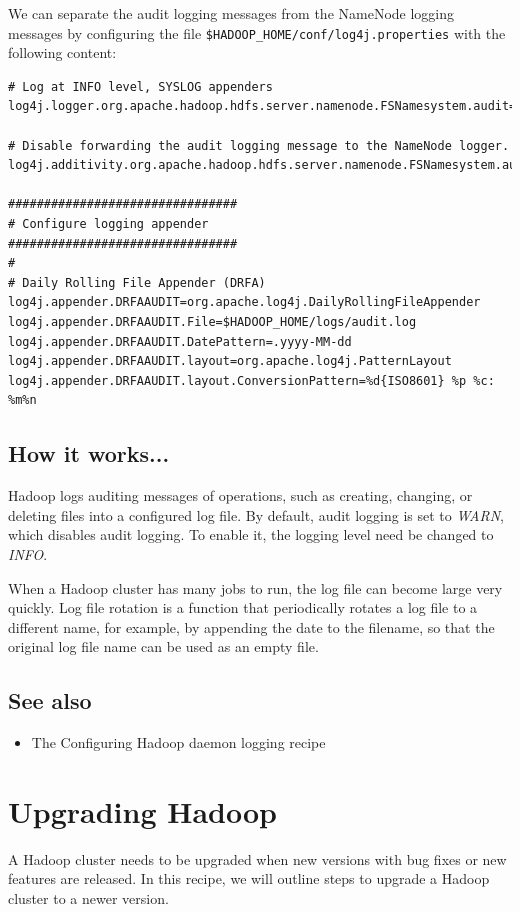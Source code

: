 We can separate the audit logging messages from the NameNode logging messages by configuring the file \verb|$HADOOP_HOME/conf/log4j.properties| with the following content: 
\lstset{style=bashstyle}
\begin{lstlisting}
# Log at INFO level, SYSLOG appenders
log4j.logger.org.apache.hadoop.hdfs.server.namenode.FSNamesystem.audit=INFO

# Disable forwarding the audit logging message to the NameNode logger.
log4j.additivity.org.apache.hadoop.hdfs.server.namenode.FSNamesystem.audit=false

################################
# Configure logging appender
################################
#
# Daily Rolling File Appender (DRFA)
log4j.appender.DRFAAUDIT=org.apache.log4j.DailyRollingFileAppender
log4j.appender.DRFAAUDIT.File=$HADOOP_HOME/logs/audit.log
log4j.appender.DRFAAUDIT.DatePattern=.yyyy-MM-dd
log4j.appender.DRFAAUDIT.layout=org.apache.log4j.PatternLayout
log4j.appender.DRFAAUDIT.layout.ConversionPattern=%d{ISO8601} %p %c: %m%n
\end{lstlisting}

\subsection*{How it works...}
Hadoop logs auditing messages of operations, such as creating, changing, or deleting files into a configured log file. By default, audit logging is set to \emph{WARN}, which disables audit logging. To enable it, the logging level need be changed to \emph{INFO}.

When a Hadoop cluster has many jobs to run, the log file can become large very quickly. Log file rotation is a function that periodically rotates a log file to a different name, for example, by appending the date to the filename, so that the original log file name can be used as an empty file.
\subsection*{See also}
\begin{itemize}
  \item The Configuring Hadoop daemon logging recipe
\end{itemize}

\section{Upgrading Hadoop}
A Hadoop cluster needs to be upgraded when new versions with bug fixes or new features are released. In this recipe, we will outline steps to upgrade a Hadoop cluster to a newer version.

